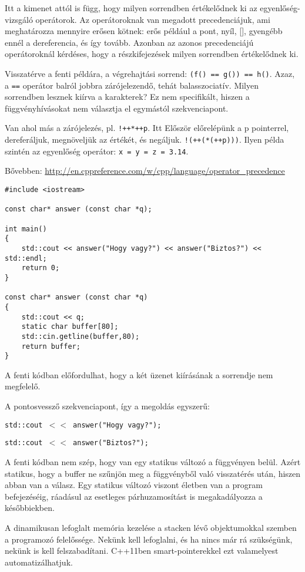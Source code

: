 \documentclass[a4paper,11.5pt,table]{article}
\begin{document}
	Itt a kimenet attól is függ, hogy milyen sorrendben értékelődnek ki az egyenlőség-vizsgáló operátorok. Az operátoroknak van megadott precedenciájuk, ami meghatározza mennyire erősen kötnek: erős például a pont, nyíl, [], gyengébb ennél a dereferencia, és így tovább. Azonban az azonos precedenciájú operátoroknál kérdéses, hogy a részkifejezések milyen sorrendben értékelődnek ki. 
	
	Visszatérve a fenti példára, a végrehajtási sorrend:
	\texttt{(f() == g()) == h()}. Azaz, a \texttt{==} operátor balról jobbra zárójelezendő, tehát balasszociatív. Milyen sorrendben lesznek kiírva a karakterek? Ez nem specifikált, hiszen a függvényhívásokat nem választja el egymástól szekvenciapont.
	
	Van ahol más a zárójelezés, pl. \texttt{!++*++p}. Itt Először előrelépünk a p pointerrel, dereferáljuk, megnöveljük az értékét, és negáljuk. \texttt{!(++(*(++p)))}. Ilyen példa szintén az egyenlőség operátor: \texttt{x = y = z = 3.14}. 
	\begin{note}
		Bővebben: \url{http://en.cppreference.com/w/cpp/language/operator_precedence}
	\end{note}
	\begin{lstlisting}
#include <iostream>

const char* answer (const char *q);

int main()
{
	std::cout << answer("Hogy vagy?") << answer("Biztos?") << std::endl;
	return 0;
}

const char* answer (const char *q)
{
	std::cout << q;
	static char buffer[80];
	std::cin.getline(buffer,80);
	return buffer;
}
	\end{lstlisting}
	A fenti kódban előfordulhat, hogy a két üzenet kiírásának a sorrendje nem megfelelő. 
	
	A pontosvessző szekvenciapont, így a megoldás egyszerű:
	
	\texttt{std::cout $<<$ answer("Hogy vagy?");}
	
	\texttt{std::cout $<<$ answer("Biztos?");}
	
	A fenti kódban nem szép, hogy van egy statikus változó a függvényen belül. Azért statikus, hogy a buffer ne szűnjön meg a függvényből való visszatérés után, hiszen abban van a válasz. Egy statikus változó viszont életben van a program befejezéséig, ráadásul az esetleges párhuzamosítást is megakadályozza a későbbiekben.
	\medskip
	
	A dinamikusan lefoglalt memória kezelése a stacken lévő objektumokkal szemben a programozó felelőssége. Nekünk kell lefoglalni, és ha nincs már rá szükségünk, nekünk is kell felszabadítani. C++11ben smart-pointerekkel ezt valamelyest automatizálhatjuk.
	
\end{document}
